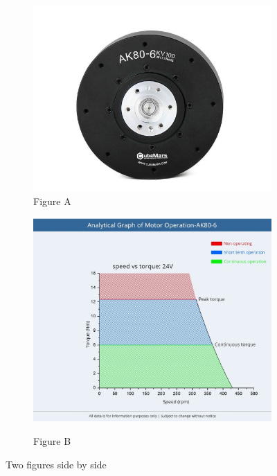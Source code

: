 \begin{figure}[htbp]
  \centering
  \begin{subfigure}[b]{0.45\textwidth}
    \centering
    \includegraphics[width=\textwidth]{figures/hardware_setup/motor.jpg}
    \caption{Figure A}
    \label{fig:subfiga}
  \end{subfigure}
  \hfill
  \begin{subfigure}[b]{0.45\textwidth}
    \centering
    \includegraphics[width=\textwidth]{figures/hardware_setup/torque_speed_curve.jpg}
    \label{fig:subfigb}
    \caption{Figure B}
  \end{subfigure}
  \caption{Two figures side by side}
  \label{fig:twosubfigures}
\end{figure}

